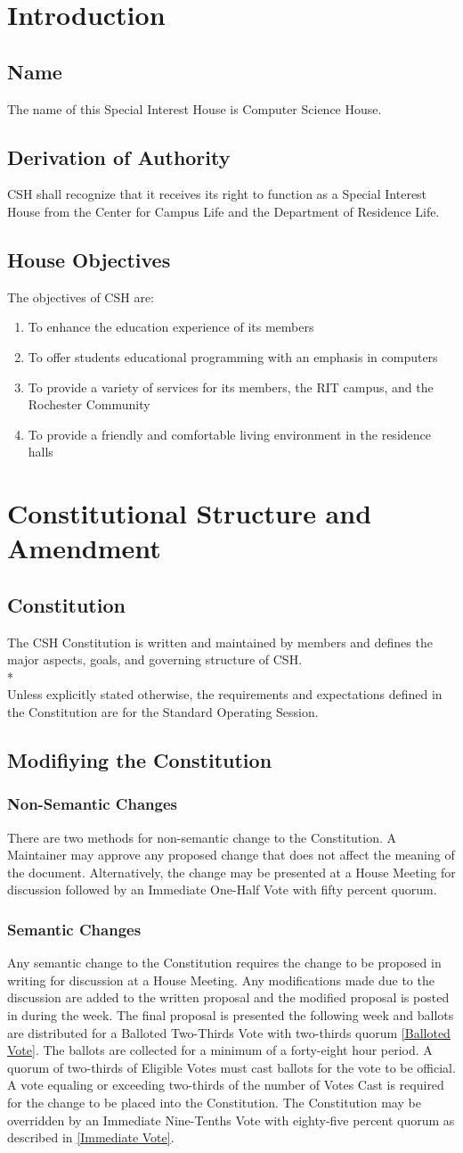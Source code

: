 \documentclass{article}
\newcommand{\article}[1]{\section{#1} \label{#1}}
\newcommand{\asection}[1]{\subsection{#1} \label{#1}}
\newcommand{\asubsection}[1]{\subsubsection{#1} \label{#1}}
\begin{document}
\article{Introduction}

\asection{Name}
The name of this Special Interest House is Computer Science House.

\asection{Derivation of Authority}
CSH shall recognize that it receives its right to function as a Special Interest House from the Center for Campus Life and the Department of Residence Life.

\asection{House Objectives}
The objectives of CSH are:
\begin{enumerate}
	\item To enhance the education experience of its members
	\item To offer students educational programming with an emphasis in computers
	\item To provide a variety of services for its members, the RIT campus, and the Rochester Community
	\item To provide a friendly and comfortable living environment in the residence halls
\end{enumerate}

\article{Constitutional Structure and Amendment}

\asection{Constitution}
The CSH Constitution is written and maintained by members and defines the major aspects, goals, and governing structure of CSH.
\\*\\
Unless explicitly stated otherwise, the requirements and expectations defined in the Constitution are for the Standard Operating Session.

\subsection{Modifiying the Constitution}
\asubsection{Non-Semantic Changes}
There are two methods for non-semantic change to the Constitution.
A Maintainer may approve any proposed change that does not affect the meaning of the document.
Alternatively, the change may be presented at a House Meeting for discussion followed by an Immediate One-Half Vote with fifty percent quorum.

\asubsection{Semantic Changes}
Any semantic change to the Constitution requires the change to be proposed in writing for discussion at a House Meeting.
Any modifications made due to the discussion are added to the written proposal and the modified proposal is posted in during the week.
The final proposal is presented the following week and ballots are distributed for a Balloted Two-Thirds Vote with two-thirds quorum \ref{Balloted Vote}.
The ballots are collected for a minimum of a forty-eight hour period.
A quorum of two-thirds of Eligible Votes must cast ballots for the vote to be official.
A vote equaling or exceeding two-thirds of the number of Votes Cast is required for the change to be placed into the Constitution.
The Constitution may be overridden by an Immediate Nine-Tenths Vote with eighty-five percent quorum as described in \ref{Immediate Vote}.
\end{document}

